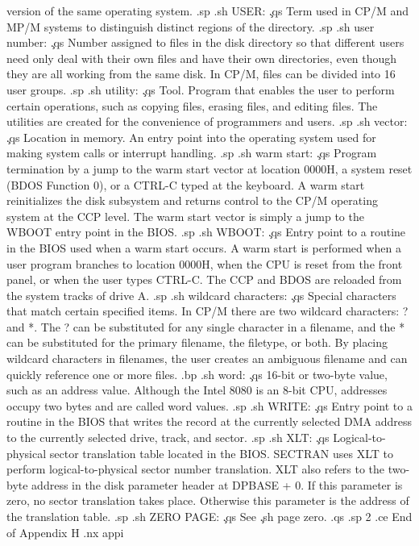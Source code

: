 version of the same operating system.
.sp
.sh
USER:  \c
.qs
Term used in CP/M and MP/M systems to distinguish distinct 
regions of the directory.
.sp
.sh
user number:  \c
.qs
Number assigned to files in the disk directory so that different 
users need only deal with their own files and have their own 
directories, even though they are all working from the same disk.  
In CP/M, files can be divided into 16 user groups.
.sp
.sh
utility:  \c
.qs
Tool.  Program that enables the user to perform certain 
operations, such as copying files, erasing files, and editing 
files.  The utilities are created for the convenience of 
programmers and users.
.sp
.sh
vector:  \c
.qs
Location in memory.  An entry point into the operating system 
used for making system calls or interrupt handling.
.sp
.sh
warm start:  \c
.qs
Program termination by a jump to the warm start vector at 
location 0000H, a system reset (BDOS Function 0), or a CTRL-C 
typed at the keyboard.  A warm start reinitializes the disk 
subsystem and returns control to the CP/M operating system at the 
CCP level.  The warm start vector is simply a jump to the WBOOT 
entry point in the BIOS.
.sp
.sh
WBOOT:  \c
.qs
Entry point to a routine in the BIOS used when a warm start 
occurs.  A warm start is performed when a user program branches 
to location 0000H, when the CPU is reset from the front panel, or 
when the user types CTRL-C.  The CCP and BDOS are reloaded from 
the system tracks of drive A.
.sp
.sh
wildcard characters:  \c
.qs
Special characters that match certain specified items.  In CP/M 
there are two wildcard characters:  ? and *.  The ? can be 
substituted for any single character in a filename, and the * can 
be substituted for the primary filename, the filetype, or both.  
By placing wildcard characters in filenames, the user creates an 
ambiguous filename and can quickly reference one or more files.
.bp
.sh
word:  \c
.qs
16-bit or two-byte value, such as an address value.  Although the 
Intel 8080 is an 8-bit CPU, addresses occupy two bytes and are 
called word values.
.sp
.sh
WRITE:  \c
.qs
Entry point to a routine in the BIOS that writes the record at 
the currently selected DMA address to the currently selected 
drive, track, and sector.
.sp
.sh
XLT:  \c
.qs
Logical-to-physical sector translation table located in the BIOS.  
SECTRAN uses XLT to perform logical-to-physical sector number 
translation.  XLT also refers to the two-byte address in the disk 
parameter header at DPBASE + 0.  If this parameter is zero, no 
sector translation takes place.  Otherwise this parameter is the 
address of the translation table.
.sp
.sh
ZERO PAGE:  \c
.qs
See \c
.sh
page zero.
.qs
.sp 2
.ce
End of Appendix H
.nx appi
